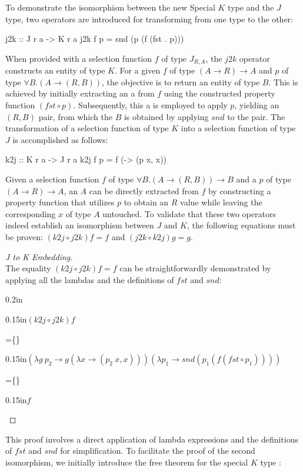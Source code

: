 \documentclass[runningheads]{llncs}
\newcommand{\equals}[1]{=\quad \{\text{ #1 }\}}
\newenvironment{reasoning}{\begin{adjustwidth}{0.2in}{}}{\end{adjustwidth}}
\newcommand{\ind}[1]{\begin{adjustwidth}{0.15in}{}\begin{math}#1\end{math}\end{adjustwidth}}
\begin{document}
To demonstrate the isomorphism between the new Special \(K\) type and
the \(J\) type, two operators are introduced for transforming from one
type to the other:

\begin{code}
j2k :: J r a -> K r a
j2k f p = snd (p (f (fst . p)))
\end{code}

When provided with a selection function \(f\) of type \(J_{R,A}\), the
\(j2k\) operator constructs an entity of type \(K\). For a given \(f\)
of type \((A \rightarrow R) \rightarrow A\) and \(p\) of type
\(\forall B. (A \rightarrow (R,B))\), the objective is to return an
entity of type \(B\). This is achieved by initially extracting an a from
\(f\) using the constructed property function \((fst \circ p)\).
Subsequently, this a is employed to apply \(p\), yielding an \((R,B)\)
pair, from which the \(B\) is obtained by applying \(snd\) to the pair.
The transformation of a selection function of type \(K\) into a
selection function of type \(J\) is accomplished as follows:

\begin{code}
k2j :: K r a -> J r a
k2j f p = f (\x -> (p x, x)) 
\end{code}

Given a selection function \(f\) of type
\(\forall B. (A \rightarrow (R,B)) \rightarrow B\) and a \(p\) of type
\((A \rightarrow R) \rightarrow A\), an \(A\) can be directly extracted
from \(f\) by constructing a property function that utilizes \(p\) to
obtain an \(R\) value while leaving the corresponding \(x\) of type
\(A\) untouched. To validate that these two operators indeed establish
an isomorphism between \(J\) and \(K\), the following equations must be
proven: \((k2j \circ j2k) f = f\) and \((j2k \circ k2j) g = g\).

\begin{proof}[J to K Embedding]\\
The equality $(k2j \circ j2k) f = f$ can be straightforwardly demonstrated by applying all the 
lambdas and the definitions of $fst$ and $snd$:
\begin{reasoning}
  \ind{(k2j \circ j2k) f}
  \equals{Apply definitions}
  \ind{(\lambda g\:p_2 \rightarrow g (\lambda x \rightarrow (p_2\:x, x))) (\lambda p_1 \rightarrow snd (p_1 (f (fst \circ p_1))))}
  \equals{Simplify}
  \ind{f}
\end{reasoning}
\end{proof}

This proof involves a direct application of lambda expressions and the
definitions of \(fst\) and \(snd\) for simplification. To facilitate the
proof of the second isomorphism, we initially introduce the free theorem
for the special \(K\) type \cite{wadler1989theorems}:
\end{document}
